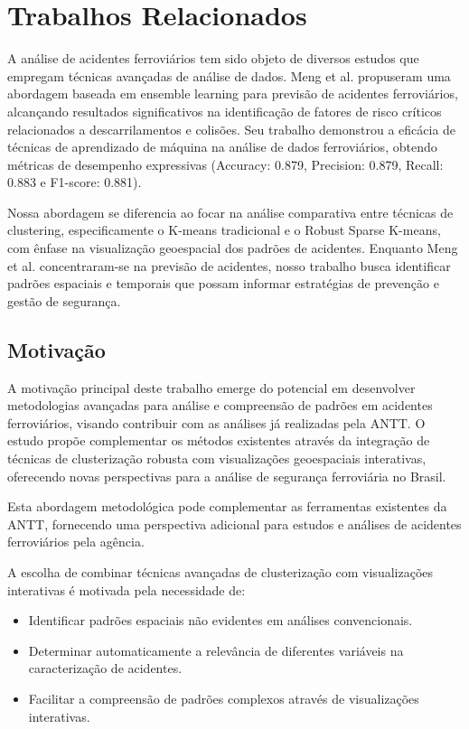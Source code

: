 \documentclass[conference]{IEEEtran}
\begin{document}
\section{Trabalhos Relacionados}

A análise de acidentes ferroviários tem sido objeto de diversos estudos que empregam técnicas avançadas de análise de dados. Meng et al. \cite{b6} propuseram uma abordagem baseada em ensemble learning para previsão de acidentes ferroviários, alcançando resultados significativos na identificação de fatores de risco críticos relacionados a descarrilamentos e colisões. Seu trabalho demonstrou a eficácia de técnicas de aprendizado de máquina na análise de dados ferroviários, obtendo métricas de desempenho expressivas (Accuracy: 0.879, Precision: 0.879, Recall: 0.883 e F1-score: 0.881).

Nossa abordagem se diferencia ao focar na análise comparativa entre técnicas de clustering, especificamente o K-means tradicional e o Robust Sparse K-means, com ênfase na visualização geoespacial dos padrões de acidentes. Enquanto Meng et al. concentraram-se na previsão de acidentes, nosso trabalho busca identificar padrões espaciais e temporais que possam informar estratégias de prevenção e gestão de segurança.


\subsection{Motivação}
A motivação principal deste trabalho emerge do potencial em desenvolver metodologias avançadas para análise e compreensão de padrões em acidentes ferroviários, visando contribuir com as análises já realizadas pela ANTT. O estudo propõe complementar os métodos existentes através da integração de técnicas de clusterização robusta com visualizações geoespaciais interativas, oferecendo novas perspectivas para a análise de segurança ferroviária no Brasil.

Esta abordagem metodológica pode complementar as ferramentas existentes da ANTT, fornecendo uma perspectiva adicional para estudos e análises de acidentes ferroviários pela agência.

A escolha de combinar técnicas avançadas de clusterização com visualizações interativas é motivada pela necessidade de:
\begin{itemize}
\item Identificar padrões espaciais não evidentes em análises convencionais.
\item Determinar automaticamente a relevância de diferentes variáveis na caracterização de acidentes.
\item Facilitar a compreensão de padrões complexos através de visualizações interativas.
\end{itemize}
\end{document}
